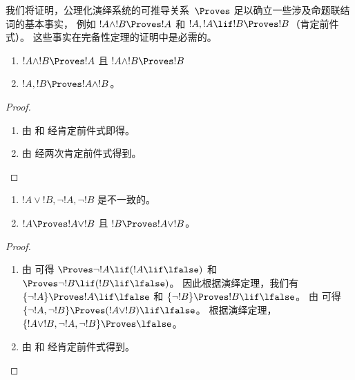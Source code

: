 \documentclass[../../../include/open-logic-section]{subfiles}
\begin{document}
      {}
      {}


\begin{explain}
  我们将证明，公理化演绎系统的可推导关系~$\Proves$ 足以确立一些涉及命题联结词的基本事实，
  例如 $!A \land !B \Proves !A$ 和 $!A, !A \lif !B \Proves !B$（肯定前件式）。
  这些事实在完备性定理的证明中是必需的。
\end{explain}

\begin{prop}
  \begin{enumerate}
  \item {} $!A \land !B \Proves
    !A$ 且 $!A \land !B \Proves !B$
  \item {} $!A, !B \Proves !A \land !B$。
  \end{enumerate}
\end{prop}

\begin{proof}
  \begin{enumerate}
    \item 由  和  经肯定前件式即得。
  \item 由  经两次肯定前件式得到。
  \end{enumerate}
\end{proof}


\begin{prop}
  \begin{enumerate}
  \item $!A \lor !B, \lnot !A, \lnot !B$ 是不一致的。
  \item $!A \Proves !A \lor !B$ 且 $!B \Proves !A \lor !B$。
  \end{enumerate}
\end{prop}

\begin{proof}
  \begin{enumerate}
  \item 由  可得 $\Proves \lnot !A \lif (!A
    \lif \lfalse)$ 和 $\Proves \lnot !B \lif (!B \lif \lfalse)$。
    因此根据演绎定理，我们有 $\{\lnot !A\} \Proves !A \lif
    \lfalse$ 和 $\{\lnot !B\} \Proves !B \lif \lfalse$。
    由  可得 $\{\lnot !A, \lnot !B\} \Proves (!A
    \lor !B) \lif \lfalse$。
    根据演绎定理，$\{!A \lor !B,
    \lnot !A, \lnot !B\} \Proves \lfalse$。
  \item 由  和  经肯定前件式得到。
  \end{enumerate}
\end{proof}
\end{document}
